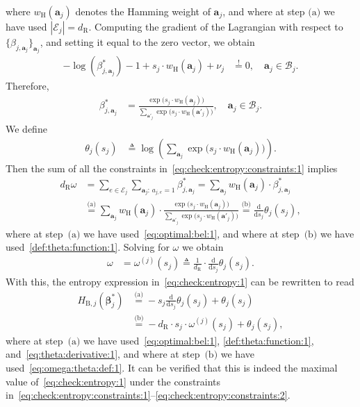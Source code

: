 \documentclass[journal, twocolumn]{IEEEtran}
\renewcommand{\mathbf}[1]{{\bm{#1}}}
\newcommand{\vect}[1]{\mathbf{#1}}
\newcommand{\set}[1]{\mathcal{#1}}
\newcommand{\defeq}{\triangleq}
\newcommand{\onestareq}{\overset{\text{(a)}}{=}}
\newcommand{\twostarseq}{\overset{\text{(b)}}{=}}
\newcommand{\onestar}{\text{(a)}}
\newcommand{\twostars}{\text{(b)}}
\newcommand{\bel}{\beta}
\newcommand{\bels}{\bel^{*}}
\newcommand{\vbels}{\boldsymbol{\bel}^{*}}
\newcommand{\setE}{\set{E}}
\newcommand{\rdiff}[1]{\frac{\mathrm{d}}{\mathrm{d}#1}}
\newcommand{\va}{\vect{a}}
\newcommand{\dright}{d_{\mathrm{R}}}
\newcommand{\wH}{w_{\mathrm{H}}}
\newcommand{\HBethesub}[1]{H_{\mathrm{B},#1}}
\newcommand{\?}{\mathrm{?}}
\begin{document}
where $\wH(\va_j)$ denotes the Hamming weight of $\va_j$, and where at step
$\onestar$ we have used $|\setE_j| = \dright$. Computing the gradient of the
Lagrangian with respect to $\{ \bel_{j,\va_j} \}_{\va_j}$, and setting it
equal to the zero vector, we obtain
\begin{align*}
  -
  \log(\bels_{j,\va_j})
  -
  1
  +
  s_j
  \cdot
  \wH(\va_j)
  +
  \nu_j
    &\overset{!}{=}
       0,
       \quad \va_j \in \set{B}_j.
\end{align*}
Therefore,
\begin{align}
  \bels_{j,\va_j}
    &= \frac{\exp\big( s_j \cdot \wH(\va_j) \big)}
            {\sum_{\va'_j}
               \exp\big( s_j \cdot \wH(\va'_j) \big)
            },
            \quad \va_j \in \set{B}_j.
              \label{eq:optimal:bel:1}
\end{align}
We define
\begin{align}
  \theta_j(s_j)
    &\defeq
       \log
         \left(
           \sum_{\va_j}
             \exp\big( s_j \cdot \wH(\va_j) \big)
         \right).
           \label{def:theta:function:1}
\end{align}
Then the sum of all the constraints in~\eqref{eq:check:entropy:constraints:1}
implies
\begin{align}
  \dright \omega
    &= \sum_{e \in \set{E}_j}
         \sum_{\va_j: \, a_{j,e} = 1}
           \bels_{j,\va_j}
     = \sum_{\va_j}
         \wH(\va_j) \cdot \bels_{j,\va_j} \nonumber \\
    &\onestareq
       \sum_{\va_j}
         \wH(\va_j)
         \cdot
         \frac{\exp\big( s_j \cdot \wH(\va_j) \big)}
            {\sum_{\va'_j}
               \exp\big( s_j \cdot \wH(\va'_j) \big)
            }
     \twostarseq
       \rdiff{s_j} \theta_j(s_j),
         \label{eq:theta:derivative:1}
\end{align}
where at step~$\onestar$ we have used~\eqref{eq:optimal:bel:1}, and where at
step~$\twostars$ we have used~\eqref{def:theta:function:1}. Solving for
$\omega$ we obtain
\begin{align}
  \omega
    &= \omega^{(j)}(s_j)
     \defeq
       \frac{1}{\dright}
       \cdot
       \rdiff{s_j} \theta_j(s_j).
         \label{eq:omega:theta:def:1}
\end{align}
With this, the entropy expression
in~\eqref{eq:check:entropy:1} can be rewritten to read
\begin{align}
  \HBethesub{j}(\vbels_j)
    &\onestareq
       -
       s_j \rdiff{s_j} \theta_j(s_j)
       +
       \theta_j(s_j) \nonumber \\
    &\twostarseq 
       -
       \dright \cdot s_j \cdot \omega^{(j)}(s_j)
       +
       \theta_j(s_j),
         \label{eq:Bethe:entropy:value:j:1}
\end{align}
where at step~$\onestar$ we have used~\eqref{eq:optimal:bel:1},
\eqref{def:theta:function:1}, and~\eqref{eq:theta:derivative:1}, and where at
step~$\twostars$ we have used~\eqref{eq:omega:theta:def:1}. It can be verified
that this is indeed the maximal value of~\eqref{eq:check:entropy:1} under the
constraints
in~\eqref{eq:check:entropy:constraints:1}--\eqref{eq:check:entropy:constraints:2}.
\end{document}
